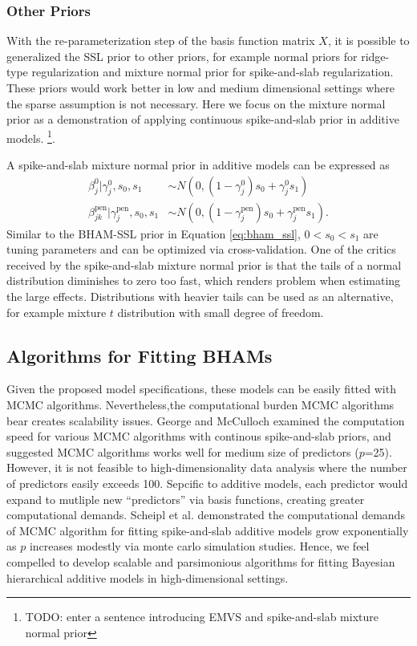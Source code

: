 \documentclass[AMA,STIX1COL,]{WileyNJD-v2}
\begin{document}
\hypertarget{other-priors}{%
\subsubsection{Other Priors}\label{other-priors}}

With the re-parameterization step of the basis function matrix \(X\), it
is possible to generalized the SSL prior to other priors, for example
normal priors for ridge-type regularization and mixture normal prior for
spike-and-slab regularization. These priors would work better in low and
medium dimensional settings where the sparse assumption is not
necessary. Here we focus on the mixture normal prior as a demonstration
of applying continuous spike-and-slab prior in additive models.
\footnote{TODO: enter a sentence introducing EMVS and spike-and-slab
  mixture normal prior}.

A spike-and-slab mixture normal prior in additive models can be
expressed as \[
\begin{aligned}
  \beta^0_{j} |\gamma^0_{j},s_0,s_1 &\sim N(0,(1-\gamma^0_{j}) s_0 + \gamma^0_{j} s_1)\nonumber\\
  \beta^\text{pen}_{jk} | \gamma^\text{pen}_{j},s_0,s_1 &\sim N(0,(1-\gamma^\text{pen}_{j}) s_0 + \gamma^\text{pen}_{j} s_1).
\end{aligned}
\] Similar to the BHAM-SSL prior in Equation \ref{eq:bham_ssl},
\(0 < s_0 < s_1\) are tuning parameters and can be optimized via
cross-validation. One of the critics received by the spike-and-slab
mixture normal prior is that the tails of a normal distribution
diminishes to zero too fast, which renders problem when estimating the
large effects. Distributions with heavier tails can be used as an
alternative, for example mixture \(t\) distribution with small degree of
freedom.

\hypertarget{algorithms-for-fitting-bhams}{%
\subsection{Algorithms for Fitting
BHAMs}\label{algorithms-for-fitting-bhams}}

Given the proposed model specifications, these models can be easily
fitted with MCMC algorithms. Nevertheless,the computational burden MCMC
algorithms bear creates scalability issues. George and
McCulloch\citep{George1997} examined the computation speed for various
MCMC algorithms with continous spike-and-slab priors, and suggested MCMC
algorithms works well for medium size of predictors (\(p\)=25). However,
it is not feasible to high-dimensionality data analysis where the number
of predictors easily exceeds 100. Sepcific to additive models, each
predictor would expand to mutliple new ``predictors'' via basis
functions, creating greater computational demands. Scheipl et al.
\citep{Scheipl2013} demonstrated the computational demands of MCMC
algorithm for fitting spike-and-slab additive models grow exponentially
as \(p\) increases modestly via monte carlo simulation studies. Hence,
we feel compelled to develop scalable and parsimonious algorithms for
fitting Bayesian hierarchical additive models in high-dimensional
settings.
\end{document}
